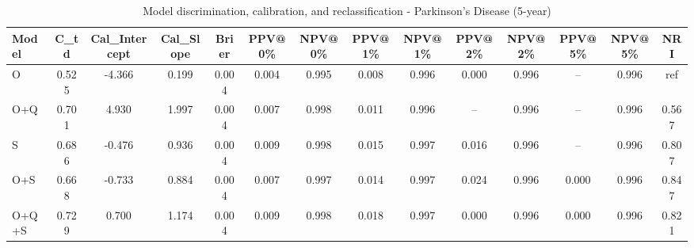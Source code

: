 \begin{table}[htbp]
\centering
\small
\caption{Model discrimination, calibration, and reclassification - Parkinson's Disease (5-year)}
\label{tab:perf_pd_5y}
\begin{tabular}{lccccccccccccc}
\toprule
Model & C\_td & Cal\_Intercept & Cal\_Slope & Brier & PPV@0\% & NPV@0\% & PPV@1\% & NPV@1\% & PPV@2\% & NPV@2\% & PPV@5\% & NPV@5\% & NRI \\
\midrule
O & 0.525 & -4.366 & 0.199 & 0.004 & 0.004 & 0.995 & 0.008 & 0.996 & 0.000 & 0.996 & -- & 0.996 & ref \\
O+Q & 0.701 & 4.930 & 1.997 & 0.004 & 0.007 & 0.998 & 0.011 & 0.996 & -- & 0.996 & -- & 0.996 & 0.567 \\
S & 0.686 & -0.476 & 0.936 & 0.004 & 0.009 & 0.998 & 0.015 & 0.997 & 0.016 & 0.996 & -- & 0.996 & 0.807 \\
O+S & 0.668 & -0.733 & 0.884 & 0.004 & 0.007 & 0.997 & 0.014 & 0.997 & 0.024 & 0.996 & 0.000 & 0.996 & 0.847 \\
O+Q+S & 0.729 & 0.700 & 1.174 & 0.004 & 0.009 & 0.998 & 0.018 & 0.997 & 0.000 & 0.996 & 0.000 & 0.996 & 0.821 \\
\bottomrule
\end{tabular}
\end{table}